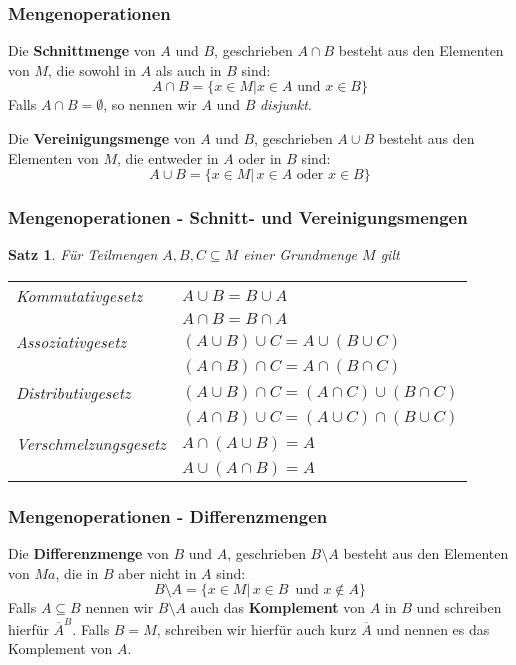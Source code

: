 \documentclass[hyperref={pdfpagelabels=false}]{beamer}
\theoremstyle{plain}%
\newtheorem*{satz}{Satz}
\theoremstyle{definition}
\theoremstyle{remark}
\begin{document}
\begin{frame}
\frametitle{Mengenoperationen}

\begin{definition} Die \textbf{Schnittmenge} von $A$ und $B$, geschrieben $A \cap B$ 
besteht aus den Elementen von $M$, die sowohl in $A$ als auch in $B$ sind:
  	$$ A \cap B = \{ x \in M \vert x \in A \textrm{ und } x \in B \} $$
Falls $A \cap B = \emptyset$, so nennen wir $A$ und $B$ \textit{disjunkt}.
\end{definition}

\pause

\begin{definition} Die \textbf{Vereinigungsmenge} von $A$ und $B$, geschrieben $A \cup B$ 
besteht aus den Elementen von $M$, die entweder in $A$ oder in $B$ sind:
  	$$ A \cup B = \{ x \in M \vert \, x \in A \textrm{ oder } x \in B \} $$
\end{definition}

\end{frame}

\begin{frame}
\frametitle{Mengenoperationen - Schnitt- und Vereinigungsmengen}

\begin{satz} F\"ur Teilmengen $A, B, C \subseteq M$ einer Grundmenge $M$ gilt

\begin{tabular} {l l }
  	Kommutativgesetz & $A \cup B = B \cup A$ \\
  	& $A \cap B = B \cap A$ \\
  	Assoziativgesetz & $( A \cup B) \cup C = A \cup ( B \cup C)$ \\
  	& $(A \cap B) \cap C = A  \cap (B \cap C)$ \\
  	Distributivgesetz & $(A \cup B) \cap C = (A \cap C) \cup (B \cap C)$ \\
  	& $(A \cap B) \cup C = (A \cup C) \cap (B \cup C)$ \\
  	Verschmelzungsgesetz & $A \cap (A \cup B) = A$ \\
  	& $A \cup (A \cap B) = A$   
\end{tabular}
\end{satz}


\end{frame}

\begin{frame}
\frametitle{Mengenoperationen - Differenzmengen}

\begin{definition} Die \textbf{Differenzmenge} von $B$ und $A$, geschrieben $B \setminus A$ 
besteht aus den Elementen von $Ma$, die in $B$ aber nicht in $A$ sind:
  	$$ B \setminus A = \{ x \in M \vert \, x \in B \, \textrm{ und } x \notin A \} $$
Falls $A \subseteq B$ nennen wir $B \setminus A$ auch das \textbf{Komplement} von $A$ in $B$ und 
schreiben hierf\"ur $\overline{A}^B$. Falls $B = M$, schreiben wir hierf\"ur auch kurz $\overline{A}$ 
und nennen es das Komplement von $A$. 
\end{definition}

\end{frame}
\end{document}
